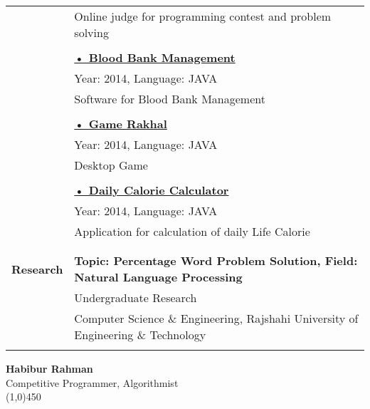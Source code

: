 \documentclass[letterpaper,11pt,oneside]{article}
\begin{document}
\begin{tabular}{@{} l l}
    & \parbox{5.0in}{Online judge for programming contest and problem solving}\\
    & \\
    & \href{https://github.com/habibrahmanbd/nirob-blood-app/}{\textbf{• Blood Bank Management}}\\
    & Year: 2014, Language: JAVA \\
    & \parbox{5.0in}{Software for Blood Bank Management}\\
    & \\
    & \href{https://github.com/habibrahmanbd/Game-Rakhal-v1.0/}{\textbf{• Game Rakhal}}\\
    & Year: 2014, Language: JAVA \\
    & \parbox{5.0in}{Desktop Game}\\
    & \\
    & \href{https://github.com/habibrahmanbd/dailyCalorieCalculator}{\textbf{• Daily Calorie Calculator}}\\
    & Year: 2014, Language: JAVA \\
    & \parbox{5.0in}{Application for calculation of daily Life Calorie}\\
    \\
    \\
 \Large{\textbf{Research}}    & \textbf{Topic: Percentage Word Problem Solution, Field: Natural Language Processing} \\
     & Undergraduate Research \\
     & Computer Science \& Engineering, Rajshahi University of Engineering \& Technology\\
     \\
\end{tabular}
\newpage
\center  \LARGE{\textbf{Habibur Rahman}} \\ \small{Competitive Programmer, Algorithmist} \\
\vspace{-1ex}
{\line(1,0){450}}
\vspace{2em}
\noindent 
\end{document}
